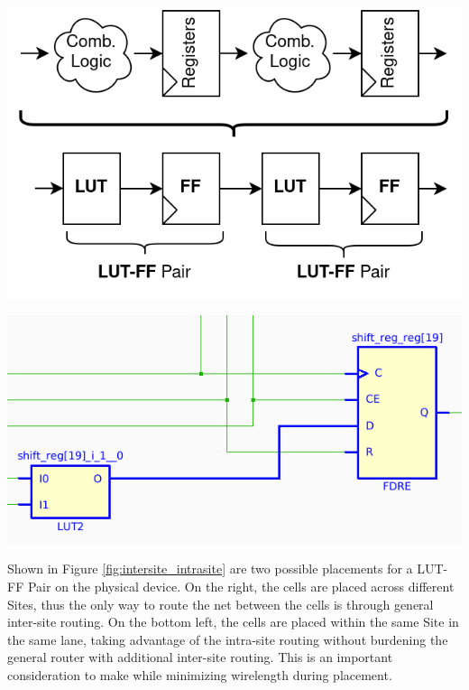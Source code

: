 \documentclass{article}
\begin{document}
\begin{multicols}{2}
        {
            \centering
            \includegraphics[width=0.9\columnwidth]{figures/pipelining.png}
            \label{fig:pipelining}
        }

        {
            \centering
            \includegraphics[width=0.9\columnwidth]{figures/lut_ff_pair.png}
            \label{fig:lut_ff_pair}
        }
        \vspace{1.0cm}

        Shown in Figure \ref{fig:intersite_intrasite} are two possible placements for a LUT-FF Pair on the physical device. 
        On the right, the cells are placed across different Sites, thus the only way to route the net between the cells is through general inter-site routing. 
        On the bottom left, the cells are placed within the same Site in the same lane, taking advantage of the intra-site routing without burdening the general router with additional inter-site routing. 
        This is an important consideration to make while minimizing wirelength during placement. 


\end{multicols}
\end{document}
